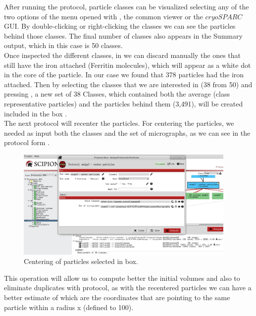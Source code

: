After running the protocol, particle classes can be visualized selecting any of the two options of the menu opened with , the common \scipion viewer or the $cryoSPARC$ GUI. By double-clicking or right-clicking the classes we can see the particles behind those classes. The final number of classes also appears in the Summary output, which in this case is 50 classes. \\

Once inspected the different classes, in \scipion we can discard manually the ones that still have the iron attached (Ferritin molecules), which will appear as a white dot in the core of the particle. In our case we found that 378 particles had the iron attached. Then by selecting the classes that we are interested in (38 from 50) and pressing , a new set of 38 Classes, which contained both the average (class representative particles) and the particles behind them (3,491), will be created included in the box .\\  

The next protocol  will recenter the particles. For centering the particles, we needed as input both the classes and the set of micrographs, as we can see in the protocol form .  

\begin{figure}[H]
  \centering
  \captionsetup{width=.8\linewidth} 
  \includegraphics[width=0.95\textwidth]
  {images/7c_xmipp3_centerparticles.pdf}
  \caption{Centering of particles selected in  box.}
  \label{fig:xmipp3_centParticles}
  \end{figure}

This operation will allow us to compute better the initial volumes and also to eliminate duplicates with  protocol, as with the recentered particles we can have a better estimate of which are the coordinates that are pointing to the same particle within a radius x (defined to 100).

